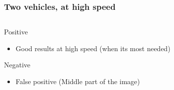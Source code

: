 \documentclass{beamer}
\begin{document}
\begin{frame}
	\end{frame}
	\begin{frame}
		\frametitle{Two vehicles, at high speed}
		\begin{columns}[t]
			\begin{column}[t]{5cm}
				\begin{exampleblock}{Positive}
				\begin{itemize}
				\item Good results at high speed (when its most needed)
				\end{itemize}
				\end{exampleblock}
								
				\begin{alertblock}{Negative}
				\begin{itemize}
				\item False positive (Middle part of the image)
				\end{itemize}
				\end{alertblock}					
		

\end{column}
\end{columns}
\end{frame}
\end{document}
